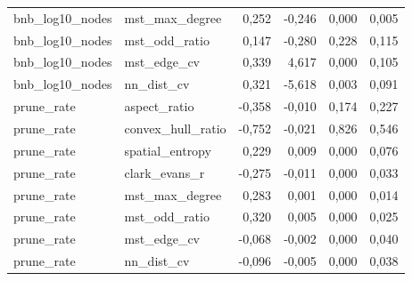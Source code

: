 \begin{tabular}{llrrrr}
bnb\_log10\_nodes & mst\_max\_degree & 0,252 & -0,246 & 0,000 & 0,005 \\
bnb\_log10\_nodes & mst\_odd\_ratio & 0,147 & -0,280 & 0,228 & 0,115 \\
bnb\_log10\_nodes & mst\_edge\_cv & 0,339 & 4,617 & 0,000 & 0,105 \\
bnb\_log10\_nodes & nn\_dist\_cv & 0,321 & -5,618 & 0,003 & 0,091 \\
prune\_rate & aspect\_ratio & -0,358 & -0,010 & 0,174 & 0,227 \\
prune\_rate & convex\_hull\_ratio & -0,752 & -0,021 & 0,826 & 0,546 \\
prune\_rate & spatial\_entropy & 0,229 & 0,009 & 0,000 & 0,076 \\
prune\_rate & clark\_evans\_r & -0,275 & -0,011 & 0,000 & 0,033 \\
prune\_rate & mst\_max\_degree & 0,283 & 0,001 & 0,000 & 0,014 \\
prune\_rate & mst\_odd\_ratio & 0,320 & 0,005 & 0,000 & 0,025 \\
prune\_rate & mst\_edge\_cv & -0,068 & -0,002 & 0,000 & 0,040 \\
prune\_rate & nn\_dist\_cv & -0,096 & -0,005 & 0,000 & 0,038 \\
\bottomrule
\end{tabular}
